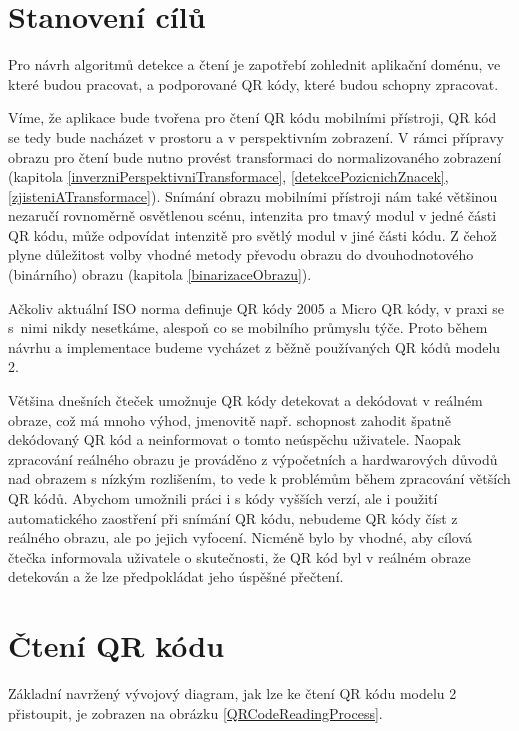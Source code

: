 \section{Stanovení cílů}

Pro návrh algoritmů detekce a čtení je zapotřebí zohlednit aplikační doménu, ve
které budou pracovat, a podporované QR kódy, které budou schopny zpracovat.

Víme, že aplikace bude tvořena pro čtení QR kódu mobilními přístroji, QR kód
se tedy bude nacházet v prostoru a v perspektivním zobrazení. V rámci přípravy
obrazu pro čtení bude nutno provést transformaci do normalizovaného zobrazení
(kapitola \ref{inverzniPerspektivniTransformace},
\ref{detekcePozicnichZnacek}, \ref{zjisteniATransformace}). Snímání obrazu
mobilními přístroji nám také většinou nezaručí rovnoměrně osvětlenou scénu, intenzita pro tmavý modul v jedné části QR kódu, může odpovídat intenzitě pro světlý modul v jiné části kódu. Z čehož plyne
důležitost volby vhodné metody převodu obrazu do dvouhodnotového (binárního)
obrazu (kapitola \ref{binarizaceObrazu}).

Ačkoliv aktuální ISO norma definuje QR kódy 2005 a Micro QR kódy, v praxi se
s~nimi nikdy nesetkáme, alespoň co se mobilního průmyslu týče. Proto během návrhu a implementace budeme vycházet z běžně používaných QR kódů modelu 2.

Většina dnešních čteček umožnuje QR kódy detekovat a dekódovat v reálném 
obraze, což má mnoho výhod, jmenovitě např. schopnost zahodit špatně dekódovaný
QR kód a neinformovat o tomto neúspěchu uživatele. Naopak zpracování reálného
obrazu je prováděno z výpočetních a hardwarových důvodů nad obrazem s nízkým
rozlišením, to vede k problémům během zpracování větších QR kódů. Abychom
umožnili práci i s kódy vyšších verzí, ale i použití automatického zaostření
při snímání QR kódu, nebudeme QR kódy číst z reálného obrazu, ale po jejich
vyfocení. Nicméně bylo by vhodné, aby cílová čtečka informovala uživatele o
skutečnosti, že QR kód byl v reálném obraze detekován a že lze předpokládat
jeho úspěšné přečtení.

\section{Čtení QR kódu}
\label{cteniQRKodu}

Základní navržený vývojový diagram, jak lze ke čtení QR kódu modelu 2
přistoupit, je zobrazen na obrázku \ref{QRCodeReadingProcess}.

